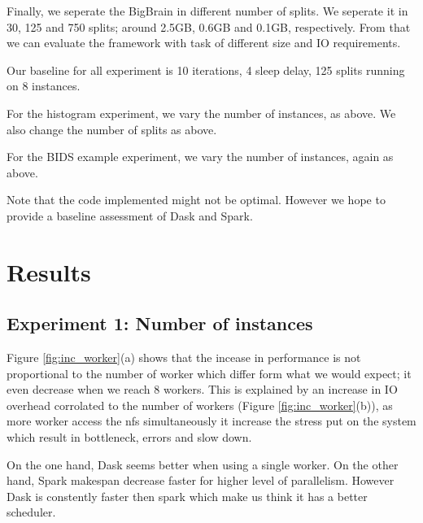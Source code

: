 \documentclass[11pt,a4paper]{article}
\begin{document}
Finally, we seperate the BigBrain in different number of splits. We seperate it in
30, 125 and 750 splits; around 2.5GB, 0.6GB and 0.1GB, respectively. From that we can
evaluate the framework with task of different size and IO requirements.

Our baseline for all experiment is 10 iterations, 4 sleep delay, 125 splits running
on 8 instances.

For the histogram experiment, we vary the number of instances, as above. We also
change the number of splits as above.

For the BIDS example experiment, we vary the number of instances, again as above.

Note that the code implemented might not be optimal. However we hope to provide a
baseline assessment of Dask and Spark.


\section{Results}

\subsection{Experiment 1: Number of instances}
Figure \ref{fig:inc_worker}(a) shows that the incease in performance is not
proportional to the number of worker which differ form what we would expect; it even
decrease when we reach 8 workers. This is explained by an increase in IO overhead
corrolated to the number of workers (Figure \ref{fig:inc_worker}(b)), as more worker
access the nfs simultaneously it increase the stress put on the system which result
in bottleneck, errors and slow down.

On the one hand, Dask seems better when using a single worker. On the other hand,
Spark makespan decrease faster for higher level of parallelism. However Dask is
constently faster then spark which make us think it has a better scheduler.
\end{document}
